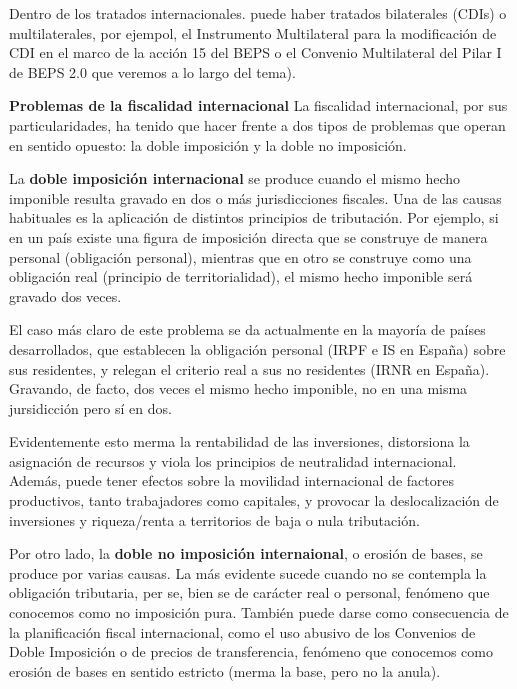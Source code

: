 \documentclass[10pt,a4paper]{article}
\begin{document}
Dentro de los tratados internacionales. puede haber tratados bilaterales (CDIs) o multilaterales, por ejempol, el Instrumento Multilateral para la modificación de CDI en el marco de la acción 15 del BEPS o el Convenio Multilateral del Pilar I de BEPS 2.0 que veremos a lo largo del tema).

\textbf{Problemas de la fiscalidad internacional}
La fiscalidad internacional, por sus particularidades, ha tenido que hacer frente a dos tipos de problemas que operan en sentido opuesto: la doble imposición y la doble no imposición.

La \textbf{doble imposición internacional} se produce cuando el mismo hecho imponible resulta gravado en dos o más jurisdicciones fiscales. Una de las causas habituales es la aplicación de distintos principios de tributación. Por ejemplo, si en un país existe una figura de imposición directa que se construye de manera personal (obligación personal), mientras que en otro se construye como una obligación real (principio de territorialidad), el mismo hecho imponible será gravado dos veces. 

El caso más claro de este problema se da actualmente en la mayoría de países desarrollados, que establecen la obligación personal (IRPF e IS en España) sobre sus residentes, y relegan el criterio real a sus no residentes (IRNR en España). Gravando, de facto, dos veces el mismo hecho imponible, no en una misma jursidicción pero sí en dos. 

Evidentemente esto merma la rentabilidad de las inversiones, distorsiona la asignación de recursos y viola los principios de neutralidad internacional. Además, puede tener efectos sobre la movilidad internacional de factores productivos, tanto trabajadores como capitales, y provocar la deslocalización de inversiones y riqueza/renta a territorios de baja o nula tributación. 

Por otro lado, la \textbf{doble no imposición internaional}, o erosión de bases, se produce por varias causas. La más evidente sucede cuando no se contempla la obligación tributaria, per se, bien se de carácter real o personal, fenómeno que conocemos como no imposición pura. También puede darse como consecuencia de la planificación fiscal internacional, como el uso abusivo de los Convenios de Doble Imposición o de precios de transferencia, fenómeno que conocemos como erosión de bases en sentido estricto (merma la base, pero no la anula).
\end{document}
